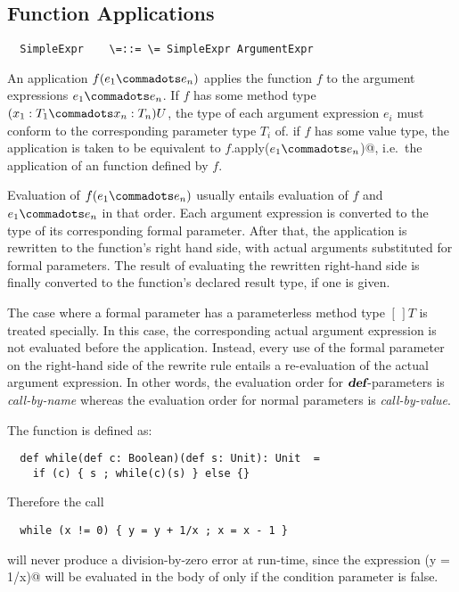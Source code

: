 \documentclass[11pt]{report}
\begin{document}
\begin{itemize}
\section{Function Applications}
\label{sec:apply}

\syntax\begin{verbatim}
  SimpleExpr    \=::= \= SimpleExpr ArgumentExpr
\end{verbatim}

An application $f(e_1 \commadots e_n)$ applies the function $f$ to the
argument expressions $e_1 \commadots e_n$. If $f$ has some method type
$(x_1: T_1 \commadots x_n: T_n)U$, the type of each argument
expression $e_i$ must conform to the corresponding parameter type
$T_i$ of. if $f$ has some value type, the application is taken to be
equivalent to \verb@$f$.apply($e_1 \commadots e_n$)@, i.e.\ the
application of an \verb@apply@ function defined by $f$.


Evaluation of $f(e_1 \commadots e_n)$ usually entails evaluation of
$f$ and $e_1 \commadots e_n$ in that order. Each argument expression
is converted to the type of its corresponding formal parameter.  After
that, the application is rewritten to the function's right hand side,
with actual arguments substituted for formal parameters.  The result
of evaluating the rewritten right-hand side is finally converted to
the function's declared result type, if one is given.

The case where a formal parameter has a parameterless method type
$[\,]T$ is treated specially. In this case, the corresponding
actual argument expression is not evaluated before the
application. Instead, every use of the formal parameter on the
right-hand side of the rewrite rule entails a re-evaluation of the
actual argument expression. In other words, the evaluation order for
$\mbox{\sl\bfseries def}$-parameters is {\em call-by-name} whereas the evaluation order
for normal parameters is {\em call-by-value}.

\example The function \verb@while@ is defined as:

\begin{verbatim}
  def while(def c: Boolean)(def s: Unit): Unit  =
    if (c) { s ; while(c)(s) } else {}
\end{verbatim}
Therefore the call
\begin{verbatim}
  while (x != 0) { y = y + 1/x ; x = x - 1 }
\end{verbatim}
will never produce a division-by-zero error at run-time, since the
expression \verb@(y = 1/x)@ will be evaluated in the body of
\verb@while@ only if the condition parameter is false.


\end{itemize}
\end{document}

